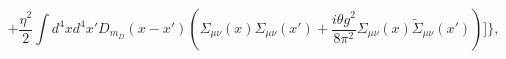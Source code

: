 \begin{equation}
\label{w4d}
+\frac{\eta^2}{2}\int d^4xd^4x'
D_{m_D}(x-x')\left(\Sigma_{\mu\nu}(x)\Sigma_{\mu\nu}(x')+
\frac{i\theta g^2}{8\pi^2}\Sigma_{\mu\nu}(x)\tilde\Sigma_{\mu\nu}(x')
\right)\Biggr]\Biggr\},
\end{equation}

